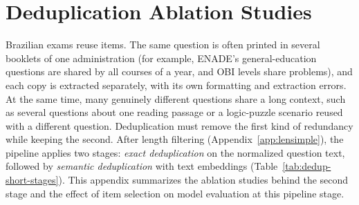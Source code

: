 %
%
\providecommand{\DedupAblationFigDir}{ablations/deduplication/figures}

\section{Deduplication Ablation Studies}
\label{app:dedup-short}

Brazilian exams reuse items. The same question is often printed in several booklets of one administration (for example, ENADE's general-education questions are shared by all courses of a year, and OBI levels share problems), and each copy is extracted separately, with its own formatting and extraction errors. At the same time, many genuinely different questions share a long context, such as several questions about one reading passage or a logic-puzzle scenario reused with a different question. Deduplication must remove the first kind of redundancy while keeping the second. After length filtering (Appendix~\ref{app:lensimple}), the pipeline applies two stages: \emph{exact deduplication} on the normalized question text, followed by \emph{semantic deduplication} with text embeddings (Table~\ref{tab:dedup-short-stages}). This appendix summarizes the ablation studies behind the second stage and the effect of item selection on model evaluation at this pipeline stage.

